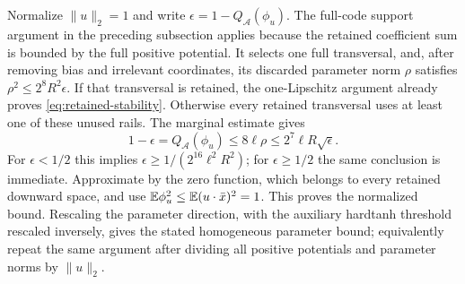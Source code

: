 Normalize $\|u\|_2=1$ and write
$\epsilon=1-Q_{\mathcal A}(\phi_u)$. The full-code support argument
in the preceding subsection applies because the retained coefficient
sum is bounded by the full positive potential. It selects one full
transversal, and, after removing bias and irrelevant coordinates,
its discarded parameter norm $\rho$ satisfies
$\rho^2\le2^8R^2\epsilon$. If that transversal is retained, the
one-Lipschitz argument already proves \eqref{eq:retained-stability}.
Otherwise every retained transversal uses at least one of these
unused rails. The marginal estimate gives
\[
 1-\epsilon=Q_{\mathcal A}(\phi_u)
 \le8\ell\rho\le2^7\ell R\sqrt\epsilon.
\]
For $\epsilon<1/2$ this implies
$\epsilon\ge1/(2^{16}\ell^2R^2)$; for $\epsilon\ge1/2$ the same
conclusion is immediate. Approximate by the zero function, which
belongs to every retained downward space, and use
$\mathbb E\phi_u^2\le\mathbb E(u\cdot\bar x)^2=1$. This proves the normalized
bound. Rescaling the parameter direction, with the auxiliary
hardtanh threshold rescaled inversely, gives the stated homogeneous
parameter bound; equivalently repeat the same argument after dividing
all positive potentials and parameter norms by $\|u\|_2$.
